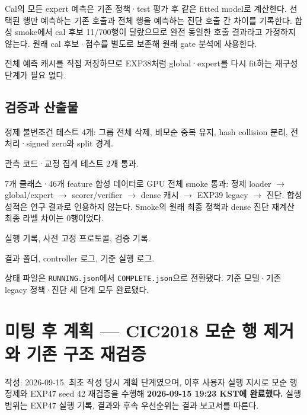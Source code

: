 \par\noindent \textbullet\enspace Cal의 모든 expert 예측은 기존 정책·test 평가 후 같은 fitted model로 계산한다. 선택된 행만 예측하는 기존 호출과 전체 행을 예측하는 진단 호출 간 차이를 기록한다. 합성 smoke에서 cal 후보 11/\allowbreak{}700행이 달랐으므로 완전 동일한 호출 결과라고 가정하지 않는다. 원래 cal 후보·점수를 별도로 보존해 원래 gate 분석에 사용한다.


\par\noindent \textbullet\enspace 전체 예측 캐시를 직접 저장하므로 EXP38처럼 global·expert를 다시 fit하는 재구성 단계가 필요 없다.


\subsection{검증과 산출물}
\par\noindent \textbullet\enspace 정제 불변조건 테스트 4개: 그룹 전체 삭제, 비모순 중복 유지, hash collision 분리, 전처리·signed zero와 split 경계.


\par\noindent \textbullet\enspace 관측 코드·교정 집계 테스트 2개 통과.


\par\noindent \textbullet\enspace 7개 클래스·46개 feature 합성 데이터로 GPU 전체 smoke 통과: 정제 loader  \ensuremath{\rightarrow}  global/\allowbreak{}expert  \ensuremath{\rightarrow}  scorer/\allowbreak{}verifier  \ensuremath{\rightarrow}  dense 캐시  \ensuremath{\rightarrow}  EXP39 legacy  \ensuremath{\rightarrow}  진단. 합성 성적은 연구 결과로 인용하지 않는다. Smoke의 원래 최종 정책과 dense 진단 재계산 최종 라벨 차이는 0행이었다.


\par\noindent \textbullet\enspace 실행 기록, 사전 고정 프로토콜, 검증 기록.


\par\noindent \textbullet\enspace 결과 폴더, controller 로그, 기준 실행 로그.


상태 파일은 \texttt{RUNNING.\allowbreak{}json}에서 \texttt{COMPLETE\allowbreak{}.\allowbreak{}json}으로 전환됐다. 기준 모델·기존 legacy 정책·진단 세 단계 모두 완료됐다.



\section{미팅 후 계획 — CIC2018 모순 행 제거와 기존 구조 재검증}
작성: 2026-09-15. 최초 작성 당시 계획 단계였으며, 이후 사용자 실행 지시로 모순 행 정제와 EXP47 seed 42 재검증을 수행해 \textbf{2026-09-15 19:23 KST에 완료했다.} 실행 범위는 EXP47 실행 기록, 결과와 후속 우선순위는 결과 보고서를 따른다.

